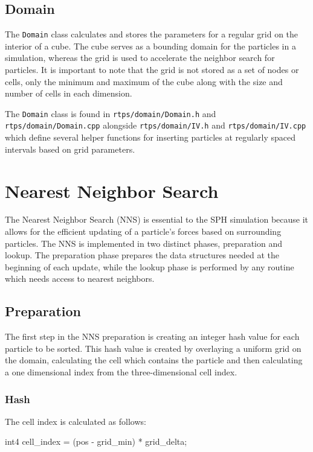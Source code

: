 \subsection{Domain}

The \verb|Domain| class calculates and stores the parameters for a regular grid
on the interior of a cube. The cube serves as a bounding domain for the
particles in a simulation, whereas the grid is used to accelerate the neighbor
search for particles. It is important to note that the grid is not stored as a
set of nodes or cells, only the minimum and maximum of the cube along with the
size and number of cells in each dimension.

The \verb|Domain| class is found in \verb|rtps/domain/Domain.h| and
\verb|rtps/domain/Domain.cpp| alongside \verb|rtps/domain/IV.h| and
\verb|rtps/domain/IV.cpp| which define several helper functions for inserting
particles at regularly spaced intervals based on grid parameters.


\section{Nearest Neighbor Search}
The Nearest Neighbor Search (NNS) is essential to the SPH simulation because it
allows for the efficient updating of a particle's forces based on surrounding
particles. The NNS is implemented in two distinct phases, preparation and
lookup. The preparation phase prepares the data structures needed at the
beginning of each update, while the lookup phase is performed by any routine
which needs access to nearest neighbors.

\subsection{Preparation}
The first step in the NNS preparation is creating an integer hash value for
each particle to be sorted. This hash value is created by overlaying a uniform
grid on the domain, calculating the cell which contains the particle and then
calculating a one dimensional index from the three-dimensional cell index.\cite{Krog2010}

\subsubsection{Hash}
The cell index is calculated as follows:
\begin{cppcode}{0}
int4 cell_index = (pos - grid_min) * grid_delta;
\end{cppcode}

